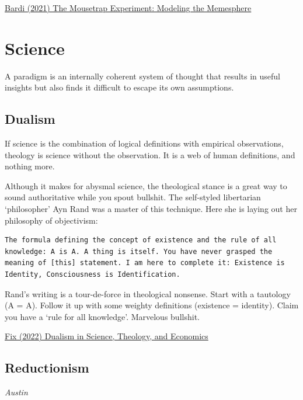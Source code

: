 \documentclass[
]{book}
\begin{document}
\href{https://thesenecaeffect.blogspot.com/2021/11/the-mousetrap-experiment-modeling.html}{Bardi (2021) The Mousetrap Experiment: Modeling the Memesphere}

\hypertarget{science}{%
\chapter{Science}\label{science}}

A paradigm is an internally coherent system of thought that results in useful insights but also finds it difficult to escape its own assumptions.

\hypertarget{dualism}{%
\section{Dualism}\label{dualism}}

If science is the combination of logical definitions with empirical observations, theology is science without the observation. It is a web of human definitions, and nothing more.

Although it makes for abysmal science, the theological stance is a great way to sound authoritative while you spout bullshit. The self-styled libertarian `philosopher' Ayn Rand was a master of this technique. Here she is laying out her philosophy of objectivism:

\begin{verbatim}
The formula defining the concept of existence and the rule of all knowledge: A is A. A thing is itself. You have never grasped the meaning of [this] statement. I am here to complete it: Existence is Identity, Consciousness is Identification.
\end{verbatim}

Rand's writing is a tour-de-force in theological nonsense. Start with a tautology (A = A). Follow it up with some weighty definitions (existence = identity). Claim you have a `rule for all knowledge'. Marvelous bullshit.

\href{https://economicsfromthetopdown.com/2022/08/10/dualism-in-science-theology-and-economics/}{Fix (2022) Dualism in Science, Theology, and Economics}

\hypertarget{reductionism}{%
\section{Reductionism}\label{reductionism}}

\emph{Austin}
\end{document}

